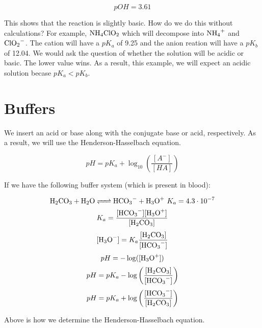 \documentclass{article}
\begin{document}
$$pOH=3.61$$

This shows that the reaction is slightly basic. How do we do this without
calculations? For example, $\ce{NH_4ClO_2}$ which will decompose into
$\ce{NH_4+}$ and $\ce{ClO_2-}$. The cation will have a $pK_a$ of 9.25 and the
anion reation will have a $pK_b$ of 12.04. We would ask the question of whether
the solution will be acidic or basic. The lower value wins. As a result, this
example, we will expect an acidic solution becase $pK_a<pK_b$.

\section{Buffers}

We insert an acid or base along with the conjugate base or acid, respectively.
As a result, we will use the Henderson-Hasselbach equation.

$$pH=pK_a+\log_{10}\left(\frac{[A^-]}{[HA]}\right)$$

If we have the following buffer system (which is present in blood):

$$\ce{H_2CO_3 + H_2O <=> HCO_3- + H_3O+}\ K_a=4.3\cdot10^{-7}$$
$$K_a=\frac{[\ce{HCO_3-}][\ce{H_3O+}]}{[\ce{H_2CO_3}]}$$
$$[\ce{H_3O-}]=K_a\frac{[\ce{H_2CO_3}]}{[\ce{HCO_3-}]}$$
$$pH=-\log([\ce{H_3O+}])$$
$$pH=pK_a-\log\left(\frac{[\ce{H_2CO_3}]}{[\ce{HCO_3-}]}\right)$$
$$pH=pK_a+\log\left(\frac{[\ce{HCO_3-}]}{[\ce{H_2CO_3}]}\right)$$

Above is how we determine the Henderson-Hasselbach equation.
\end{document}
